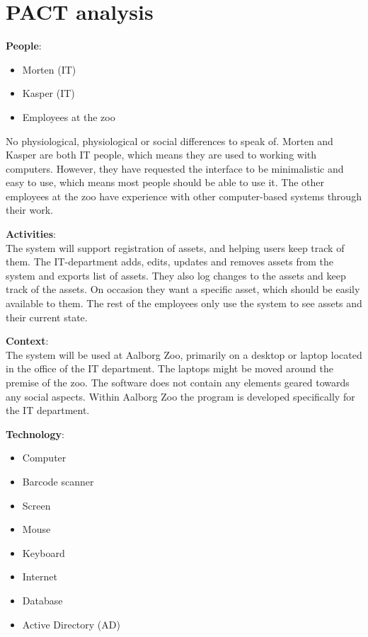 \section{PACT analysis}\label{sc:PACT}


\textbf{People}:
\begin{itemize}
    \item Morten (IT)
    \item Kasper (IT)
    \item Employees at the zoo
\end{itemize}

\par
No physiological, physiological or social differences to speak of. Morten and Kasper are both IT people, which means they are used to working with computers. However, they have requested the interface to be minimalistic and easy to use, which means most people should be able to use it.
The other employees at the zoo have experience with other computer-based systems through their work.
\par

\textbf{Activities}: \\
The system will support registration of assets, and helping users keep track of them. The IT-department adds, edits, updates and removes assets from the system and exports list of assets. They also log changes to the assets and keep track of the assets. On occasion they want a specific asset, which should be easily available to them.
The rest of the employees only use the system to see assets and their current state.
\par

\textbf{Context}: \\
The system will be used at Aalborg Zoo, primarily on a desktop or laptop located in the office of the IT department. The laptops might be moved around the premise of the zoo. The software does not contain any elements geared towards any social aspects.
Within Aalborg Zoo the program is developed specifically for the IT department.
\par
 
\textbf{Technology}:
\begin{itemize}
    \item Computer
    \item Barcode scanner
    \item Screen
    \item Mouse
    \item Keyboard
    \item Internet
    \item Database
    \item Active Directory (AD)
\end{itemize}
